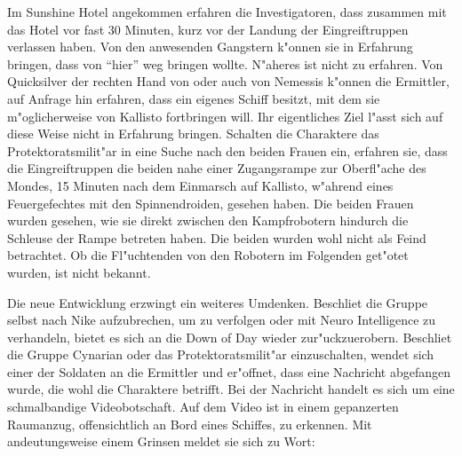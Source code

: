 Im Sunshine Hotel angekommen erfahren die Investigatoren, dass \xl{} zusammen mit \ml{} das Hotel vor fast 30 Minuten, kurz vor der Landung der Eingreiftruppen verlassen haben. Von den anwesenden Gangstern k"onnen sie in Erfahrung bringen, dass \xl{} \ml{} von "`hier"' weg bringen wollte. N"aheres ist nicht zu erfahren. Von Quicksilver der rechten Hand von \xl{} oder auch von Nemessis k"onnen die Ermittler, auf Anfrage hin erfahren, dass \xl{} ein eigenes Schiff besitzt, mit dem sie m"oglicherweise \ml{} von Kallisto fortbringen will. Ihr eigentliches Ziel l"asst sich auf diese Weise nicht in Erfahrung bringen. Schalten die Charaktere das Protektoratsmilit"ar in eine Suche nach den beiden Frauen ein, erfahren sie, dass die Eingreiftruppen die beiden nahe einer Zugangsrampe zur Oberfl"ache des Mondes, 15 Minuten nach dem Einmarsch auf Kallisto, w"ahrend eines Feuergefechtes mit den Spinnendroiden, gesehen haben. Die beiden Frauen wurden gesehen, wie sie direkt zwischen den Kampfrobotern hindurch die Schleuse der Rampe betreten haben. Die beiden wurden wohl nicht als Feind betrachtet. Ob die Fl"uchtenden von den Robotern im Folgenden get"otet wurden, ist nicht bekannt.

Die neue Entwicklung erzwingt ein weiteres Umdenken. Beschlie\3t die Gruppe selbst nach Nike aufzubrechen, um \xl{} zu verfolgen oder mit Neuro Intelligence zu verhandeln, bietet es sich an die Down of Day wieder zur"uckzuerobern. Beschlie\3t die Gruppe Cynarian oder das Protektoratsmilit"ar einzuschalten, wendet sich einer der Soldaten an die Ermittler und er"offnet, dass eine Nachricht abgefangen wurde, die wohl die Charaktere betrifft. Bei der Nachricht handelt es sich um eine schmalbandige Videobotschaft. Auf dem Video ist \xl{} in einem gepanzerten Raumanzug, offensichtlich an Bord eines Schiffes, zu erkennen. Mit andeutungsweise einem Grinsen meldet sie sich zu Wort:


